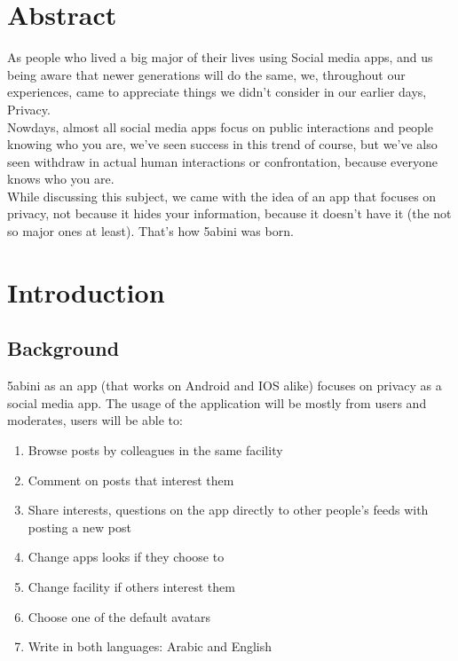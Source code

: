 \documentclass[12pt]{article}
\begin{document}
\section*{Abstract}
As people who lived a big major of their lives using Social media apps, and us being aware that newer generations will do the same, we, throughout our experiences, came to appreciate things we didn't consider in our earlier days, Privacy. \\
Nowdays, almost all social media apps focus on public interactions and people knowing who you are, we've seen success in this  trend of course, but we've also seen withdraw in actual human interactions or confrontation, because everyone knows who you are.\\  While discussing this subject, we came with the idea of an app that focuses on privacy, not because it hides your information, because it doesn't have it (the not so major ones at least). That's how 5abini was born.\sectionbreak
\sectionbreak
\sectionbreak\sectionbreak\sectionbreak\sectionbreak
\tableofcontents
\listoffigures
\sectionbreak



\section{Introduction}
\subsection{Background}
5abini as an app (that works on Android and IOS alike) focuses on privacy as a social media app. The usage of the application will be mostly from users and moderates, users will be able to:
\begin{enumerate}

\itemsep0em 
\item Browse posts by colleagues in the same facility
\item Comment on posts that interest them
\item Share interests, questions on the app directly to other people's feeds with posting a new post
\item Change apps looks if they choose to
\item Change facility if others interest them
\item Choose one of the default avatars
\item Write in both languages: Arabic and English
\end{enumerate}
\end{document}
